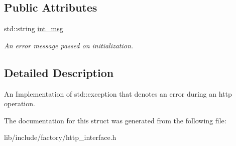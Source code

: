 \subsection*{Public Attributes}
\begin{DoxyCompactItemize}
\item 
\hypertarget{structHttpRequestException_a52a64d4648b543b81050bec3fb039e5f}{std\-::string \hyperlink{structHttpRequestException_a52a64d4648b543b81050bec3fb039e5f}{int\-\_\-msg}}\label{structHttpRequestException_a52a64d4648b543b81050bec3fb039e5f}

\begin{DoxyCompactList}\small\item\em An error message passed on initialization. \end{DoxyCompactList}\end{DoxyCompactItemize}


\subsection{Detailed Description}
An Implementation of std\-::exception that denotes an error during an http operation. 

The documentation for this struct was generated from the following file\-:\begin{DoxyCompactItemize}
\item 
lib/include/factory/http\-\_\-interface.\-h\end{DoxyCompactItemize}
